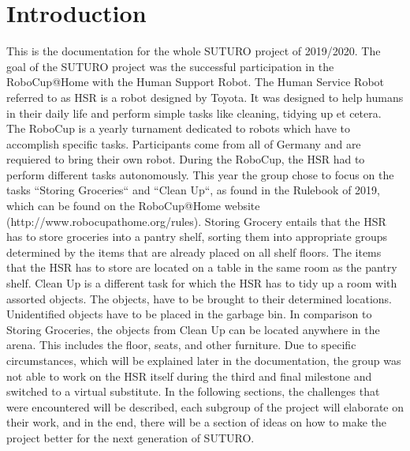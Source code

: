 \documentclass[main.tex]{subfiles}
\begin{document}
	\chapter{Introduction}
	\label{introduction}
	
	This is the documentation for the whole SUTURO project of 2019/2020. The goal of the SUTURO project was the successful participation in the RoboCup@Home with the Human Support 	Robot. The Human Service Robot referred to as HSR is a robot designed by Toyota. It was designed to help humans in their daily life and perform simple tasks like cleaning, tidying up et cetera. The RoboCup is a yearly turnament dedicated to robots which have to accomplish specific tasks. Participants come from all of Germany and are requiered to bring their own robot.
During the RoboCup, the HSR had to perform different tasks autonomously.
This year the group chose to focus on the tasks “Storing Groceries“ and “Clean Up“, as found in the Rulebook of 2019, which can be found on the RoboCup@Home website (http://www.robocupathome.org/rules). 
	Storing Grocery entails that the HSR has to store groceries into a pantry shelf, sorting them into appropriate groups determined by the items that are already placed on all shelf floors. The items that the HSR has to store are located on a table in the same room as the pantry shelf.
Clean Up is a different task for which the HSR has to tidy up a room with assorted objects. The objects, have to be brought to their determined locations. Unidentified objects have to be placed in the garbage bin. In comparison to Storing Groceries, the objects from Clean Up can be located anywhere in the arena. This includes the floor, seats, and other furniture.
Due to specific circumstances, which will be explained later in the documentation, the group was not able to work on the HSR itself during the third and final milestone and switched to a virtual substitute.
	In the following sections, the challenges that were encountered will be described, each subgroup of the project will elaborate on their work, and in the end, there will be a section of ideas on how to make the project better for the next generation of SUTURO.
	
\end{document}
